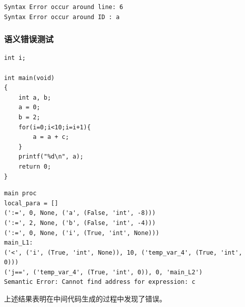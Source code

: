 \documentclass{article}
\begin{document}
\begin{verbatim}
Syntax Error occur around line: 6
Syntax Error occur around ID : a
\end{verbatim}

\subsubsection{语义错误测试}

\begin{verbatim}
int i;

int main(void)
{
    int a, b;
    a = 0;
    b = 2;
    for(i=0;i<10;i=i+1){
        a = a + c;
    }
    printf("%d\n", a);
    return 0;
}
\end{verbatim}

\begin{verbatim}
main proc
local_para = []
(':=', 0, None, ('a', (False, 'int', -8)))
(':=', 2, None, ('b', (False, 'int', -4)))
(':=', 0, None, ('i', (True, 'int', None)))
main_L1:
('<', ('i', (True, 'int', None)), 10, ('temp_var_4', (True, 'int', 0)))
('j==', ('temp_var_4', (True, 'int', 0)), 0, 'main_L2')
Semantic Error: Cannot find address for expression: c
\end{verbatim}

上述结果表明在中间代码生成的过程中发现了错误。
\end{document}
